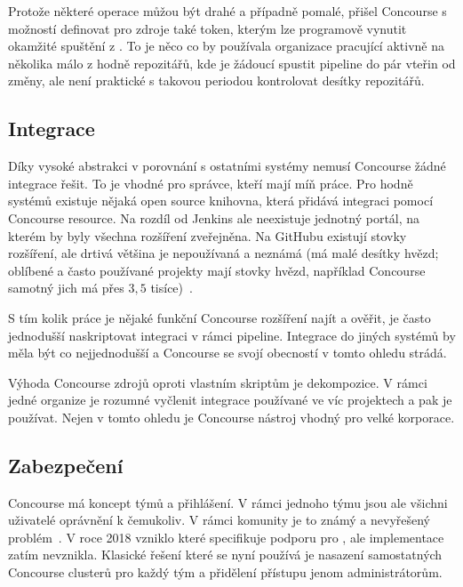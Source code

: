         Protože některé  operace můžou být drahé a případně pomalé, přišel Concourse s možností definovat pro zdroje také token, kterým lze programově vynutit okamžité spuštění  z . To je něco co by používala organizace pracující aktivně na několika málo z hodně repozitářů, kde je žádoucí spustit pipeline do pár vteřin od změny, ale není praktické s takovou periodou kontrolovat desítky repozitářů.

    \subsection{Integrace}
        Díky vysoké abstrakci v porovnání s ostatními \CI systémy nemusí Concourse žádné integrace řešit. To je vhodné pro správce, kteří mají míň práce. Pro hodně systémů existuje nějaká open source knihovna, která přidává integraci pomocí Concourse resource. Na rozdíl od Jenkins ale neexistuje jednotný portál, na kterém by byly všechna rozšíření zveřejněna. Na GitHubu existují stovky rozšíření, ale drtivá většina je nepoužívaná a neznámá (má malé desítky hvězd; oblíbené a často používané projekty mají stovky hvězd, například Concourse samotný jich má přes $3,5$ tisíce)~\cite{concourse-resource-list}.

        S tím kolik práce je nějaké funkční Concourse rozšíření najít a ověřit, je často jednodušší naskriptovat integraci v rámci pipeline. Integrace \CI do jiných systémů by měla být co nejjednodušší a Concourse se svojí obecností v tomto ohledu strádá.

        Výhoda Concourse zdrojů oproti vlastním skriptům je dekompozice. V rámci jedné organize je rozumné vyčlenit integrace používané ve víc projektech a pak je používat. Nejen v tomto ohledu je Concourse nástroj vhodný pro velké korporace.

    \subsection{Zabezpečení}
        \label{subsec:concourse-security}

        Concourse má koncept týmů a přihlášení. V rámci jednoho týmu jsou ale všichni uživatelé oprávnění k čemukoliv. V rámci komunity je to známý a nevyřešený problém~\cite{concourse-issue-1317}. V roce 2018 vzniklo  které specifikuje podporu pro , ale implementace zatím nevznikla. Klasické řešení které se nyní používá je nasazení samostatných Concourse clusterů pro každý tým a přidělení přístupu jenom administrátorům.

